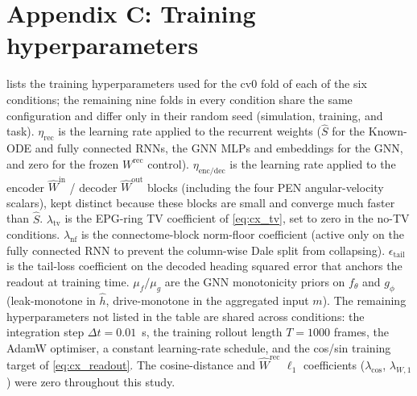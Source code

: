 \documentclass[11pt]{article}
\begin{document}
\clearpage

\section*{Appendix C: Training hyperparameters}
\label{app:hyperparams}

 lists the training hyperparameters used
for the cv0 fold of each of the six conditions; the remaining nine
folds in every condition share the same configuration and differ
only in their random seed (simulation, training, and task).
$\eta_{\mathrm{rec}}$ is the learning rate applied to the recurrent
weights ($\hat S$ for the Known-ODE and fully connected RNNs, the
GNN MLPs and embeddings for the GNN, and zero for the frozen
$W^{\mathrm{rec}}$ control). $\eta_{\mathrm{enc/dec}}$ is the
learning rate applied to the encoder $\hat W^{\mathrm{in}}$ /
decoder $\hat W^{\mathrm{out}}$ blocks (including the four PEN
angular-velocity scalars), kept distinct because these blocks are
small and converge much faster than $\hat S$.
$\lambda_{\mathrm{tv}}$ is the EPG-ring TV coefficient of
\cref{eq:cx_tv}, set to zero in the no-TV conditions.
$\lambda_{\mathrm{nf}}$ is the connectome-block norm-floor
coefficient (active only on the fully connected RNN to prevent the
column-wise Dale split from collapsing). $\epsilon_{\mathrm{tail}}$
is the tail-loss coefficient on the decoded heading squared error
that anchors the readout at training time. $\mu_f / \mu_g$ are the
GNN monotonicity priors on $f_\theta$ and $g_\phi$ (leak-monotone
in $\hat h$, drive-monotone in the aggregated input $m$). The
remaining hyperparameters not listed in the table are shared
across conditions: the integration step $\Delta t = 0.01$~s, the
training rollout length $T = 1000$ frames, the AdamW optimiser, a
constant learning-rate schedule, and the cos/sin training
target of \cref{eq:cx_readout}. The cosine-distance and
$\hat W^{\mathrm{rec}}$ $\ell_1$ coefficients
($\lambda_{\mathrm{cos}}$, $\lambda_{W,1}$) were zero throughout
this study.

\begin{table}[H]
\centering
\small

\caption{\textbf{Training hyperparameters for the cv0 fold of each
of the six conditions} (the other nine folds share the same
configuration). $\eta_{\mathrm{rec}}$, $\eta_{\mathrm{enc/dec}}$:
learning rates on the recurrent / encoder--decoder parameter
blocks. $\lambda_{\mathrm{tv}}$, $\lambda_{\mathrm{nf}}$:
EPG-ring TV (\cref{eq:cx_tv}) and per-block norm-floor coefficients.
$\epsilon_{\mathrm{tail}}$: tail-loss coefficient on the decoded
heading. $\mu_f/\mu_g$: GNN drift / message monotonicity priors
of \cref{eq:cx_gnn_dynamics}. $n_{\mathrm{epochs}}$:
training epochs. $|\mathcal B|$: batch size.
``--'' marks coefficients that do not exist in the corresponding
architecture (e.g.\ $\mu_f, \mu_g$ for the Known-ODE / FC / frozen
RNNs).}
\label{tab:cv_hyperparams}
\end{table}
\end{document}
